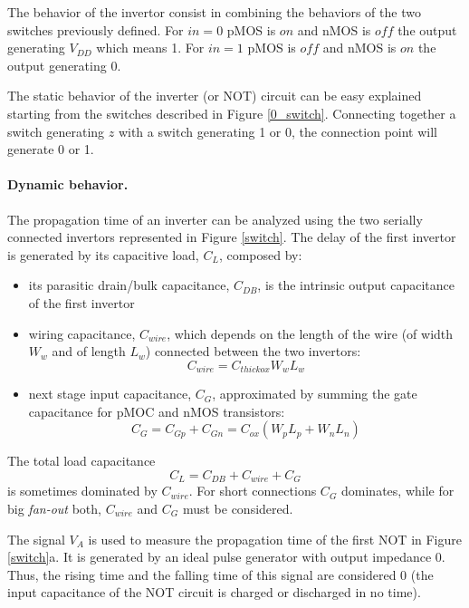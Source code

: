The behavior of the invertor consist in combining the behaviors of the
two switches previously defined. For $in=0$ pMOS is $on$ and nMOS is
$off$ the output generating $V_{DD}$ which means 1. For $in=1$ pMOS is
$off$ and nMOS is $on$ the output generating 0.

The static behavior of the inverter (or NOT) circuit can be easy
explained starting from the switches described in Figure
\ref{0_switch}. Connecting together a switch generating $z$ with a
switch generating 1 or 0, the connection point will generate 0 or
1.

\paragraph{Dynamic behavior.}
The propagation time of an inverter can be analyzed using the two
serially connected invertors represented in Figure \ref{switch}. The
delay of the first invertor is generated by its capacitive load,
$C_{L}$, composed by:
\begin{itemize}
\item its parasitic drain/bulk capacitance, $C_{DB}$, is the intrinsic  output capacitance of the first invertor
\item wiring capacitance, $C_{wire}$, which depends on the length of the wire (of width $W_w$ and of length $L_w$) connected between the two invertors: $$C_{wire} = C_{thickox} W_w L_w$$
\item next stage input capacitance, $C_{G}$, approximated by summing the gate capacitance for pMOC and nMOS transistors: $$C_G = C_{Gp} + C_{Gn} = C_{ox}(W_p L_p + W_n L_n)$$
\end{itemize}


The total load capacitance
$$C_L = C_{DB} + C_{wire} + C_G$$
is sometimes dominated by $C_{wire}$. For short connections $C_G$ dominates, while for big {\em fan-out} both, $C_{wire}$ and $C_G$ must be considered.

The signal $V_A$ is used to measure the propagation time of the first NOT in Figure \ref{switch}a. It is generated by an ideal pulse generator with output impedance 0. Thus, the rising time and the falling time of this signal are considered 0 (the input capacitance of the NOT circuit is charged  or discharged in no time).


